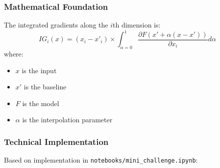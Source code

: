 \documentclass{article}
\begin{document}
\subsubsection{Mathematical Foundation}
The integrated gradients along the $i$th dimension is:
\begin{equation}
    IG_i(x) = (x_i - x'_i) \times \int_{\alpha=0}^{1} \frac{\partial F(x' + \alpha(x-x'))}{\partial x_i} d\alpha
\end{equation}
where:
\begin{itemize}
    \item $x$ is the input
    \item $x'$ is the baseline
    \item $F$ is the model
    \item $\alpha$ is the interpolation parameter
\end{itemize}

\subsubsection{Technical Implementation}
Based on implementation in \texttt{notebooks/mini\_challenge.ipynb}:
\end{document}

